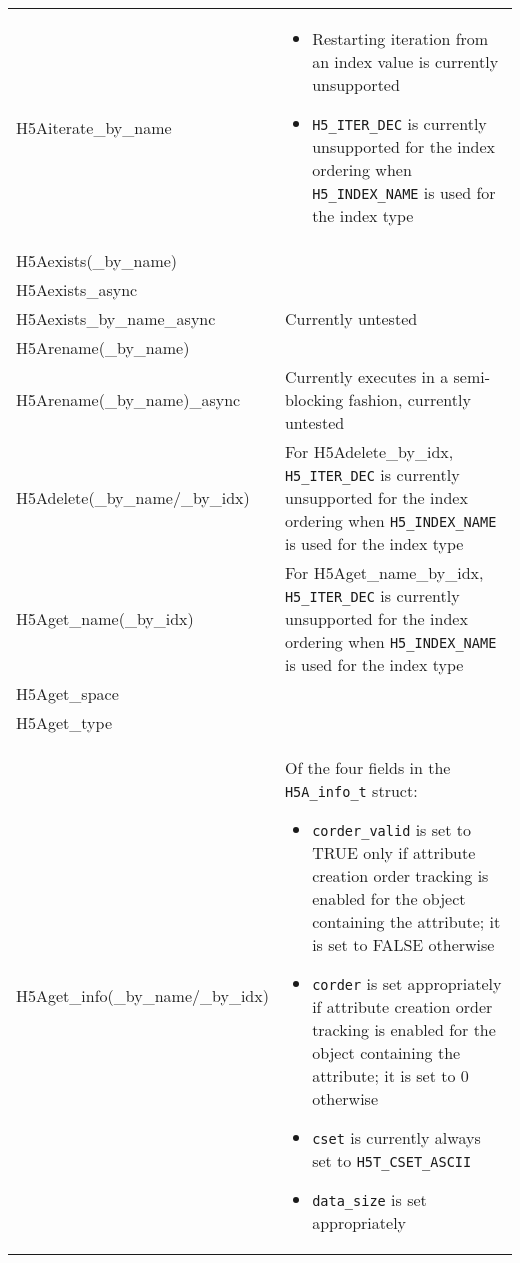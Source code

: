\documentclass[../users_guide.tex]{subfiles}
\begin{document}
\begin{center}
\begin{tabularx}{\linewidth}{| X | >{\RaggedRight}X |}
\end{tabularx}


\begin{tabularx}{\linewidth}{| X | >{\RaggedRight}X |}
\hline
\rowcolor{lightgray!50}%
\multicolumn{1}{| c |}{\textbf{API call}} & \multicolumn{1}{c |}{\textbf{Notes}} \\ \hline

H5Aiterate\_by\_name & \begin{itemize}
                           \item Restarting iteration from an index value is currently unsupported\footnotemark[1]
                           \item \texttt{H5\_ITER\_DEC} is currently unsupported for the index ordering when \texttt{H5\_INDEX\_NAME} is used for the index type
                       \end{itemize}\\ \hline
H5Aexists(\_by\_name) & \\ \hline
H5Aexists\_async & \\ \hline
H5Aexists\_by\_name\_async & Currently untested\\ \hline
H5Arename(\_by\_name) & \\ \hline
H5Arename(\_by\_name)\_async & Currently executes in a semi-blocking fashion, currently untested\\ \hline
H5Adelete(\_by\_name/\_by\_idx) & For H5Adelete\_by\_idx, \texttt{H5\_ITER\_DEC} is currently unsupported for the index ordering when \texttt{H5\_INDEX\_NAME} is used for the index type\\ \hline
H5Aget\_name(\_by\_idx) & For H5Aget\_name\_by\_idx, \texttt{H5\_ITER\_DEC} is currently unsupported for the index ordering when \texttt{H5\_INDEX\_NAME} is used for the index type\\ \hline
H5Aget\_space & \\ \hline
H5Aget\_type & \\ \hline
H5Aget\_info(\_by\_name/\_by\_idx) & Of the four fields in the \texttt{H5A\_info\_t} struct:
                                     \begin{itemize}
                                         \item \texttt{corder\_valid} is set to TRUE only if attribute creation order tracking is enabled for the object containing the attribute; it is set to FALSE otherwise
                                         \item \texttt{corder} is set appropriately if attribute creation order tracking is enabled for the object containing the attribute; it is set to 0 otherwise
                                         \item \texttt{cset} is currently always set to \texttt{H5T\_CSET\_ASCII}
                                         \item \texttt{data\_size} is set appropriately
                                     \end{itemize}


\end{tabularx}
\end{center}
\end{document}
